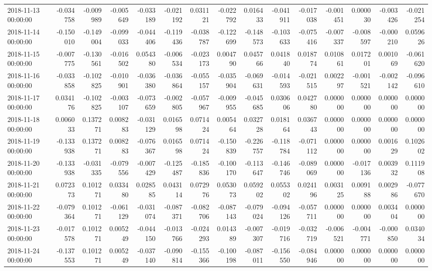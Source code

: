 \begin{tabular}{lrrrrrrrrrrrrrr}
2018-11-13 00:00:00 & -0.034758 & -0.009989 & -0.005649 & -0.033189 & -0.021192 & 0.031121 & -0.022792 & 0.016433 & -0.041911 & -0.017038 & -0.001451 & 0.000030 & -0.003426 & -0.021254 \\
2018-11-14 00:00:00 & -0.150010 & -0.149004 & -0.099033 & -0.044406 & -0.119436 & -0.038787 & -0.122699 & -0.148573 & -0.103633 & -0.075416 & -0.007337 & -0.008597 & -0.000210 & 0.059626 \\
2018-11-15 00:00:00 & -0.007775 & -0.130561 & -0.016502 & 0.054380 & -0.006534 & -0.023173 & 0.004790 & 0.045766 & 0.041840 & 0.018774 & 0.010861 & 0.017201 & 0.001069 & -0.061620 \\
2018-11-16 00:00:00 & -0.033858 & -0.102825 & -0.010901 & -0.036380 & -0.036864 & -0.055157 & -0.035904 & -0.069631 & -0.014593 & -0.021515 & 0.002297 & -0.001521 & -0.002142 & -0.096610 \\
2018-11-17 00:00:00 & 0.034176 & -0.102825 & -0.003107 & -0.073659 & -0.002805 & -0.057967 & -0.009955 & -0.045685 & 0.030606 & 0.042780 & 0.000000 & 0.000000 & 0.000000 & 0.000000 \\
2018-11-18 00:00:00 & 0.006033 & 0.137271 & 0.008283 & -0.031129 & 0.016598 & 0.071424 & 0.005464 & 0.032728 & 0.018164 & 0.036743 & 0.000000 & 0.000000 & 0.000000 & 0.000000 \\
2018-11-19 00:00:00 & -0.133938 & 0.137271 & 0.008283 & -0.076367 & 0.016598 & 0.071424 & -0.150839 & -0.226757 & -0.118784 & -0.071112 & 0.000000 & 0.000000 & 0.001629 & 0.102602 \\
2018-11-20 00:00:00 & -0.133938 & -0.031335 & -0.079556 & -0.007429 & -0.125487 & -0.185836 & -0.100170 & -0.113647 & -0.146746 & -0.089069 & 0.000000 & -0.017136 & 0.003932 & 0.111908 \\
2018-11-21 00:00:00 & 0.072373 & 0.101271 & 0.033480 & 0.028585 & 0.043114 & 0.072976 & 0.053073 & 0.059202 & 0.055302 & 0.024196 & 0.003125 & 0.009188 & 0.002986 & -0.077670 \\
2018-11-22 00:00:00 & -0.079364 & 0.101271 & -0.061129 & -0.031074 & -0.087371 & -0.082706 & -0.087143 & -0.079024 & -0.094126 & -0.057711 & 0.000000 & 0.000000 & 0.003404 & 0.000000 \\
2018-11-23 00:00:00 & -0.017578 & 0.101271 & 0.005249 & -0.044150 & -0.013766 & -0.024293 & 0.014389 & -0.007307 & -0.019716 & -0.032719 & -0.006521 & -0.004771 & -0.000850 & 0.034034 \\
2018-11-24 00:00:00 & -0.137553 & 0.101271 & 0.005249 & -0.037140 & -0.090814 & -0.155366 & -0.100198 & -0.087011 & -0.156550 & -0.084946 & 0.000000 & 0.000000 & 0.000000 & 0.000000 \\

\end{tabular}
